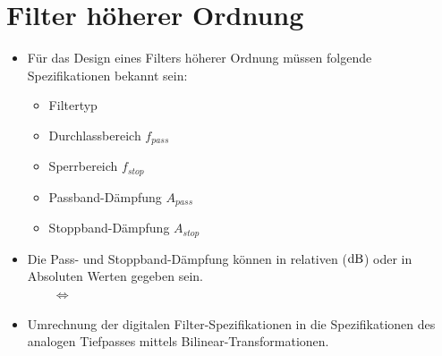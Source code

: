 	\section{Filter höherer Ordnung}
		\begin{itemize}
			\item Für das Design eines Filters höherer Ordnung müssen folgende Spezifikationen bekannt sein:\\[0.2cm]
			\begin{minipage}{0.35\textwidth}
			 \begin{itemize}
			  \item Filtertyp
			  \item Durchlassbereich $f_{pass}$
			  \item Sperrbereich $f_{stop}$
			 \end{itemize}
			\end{minipage}
			\begin{minipage}{0.5\textwidth}
			 \begin{itemize}
			  \item Passband-Dämpfung $A_{pass}$
			  \item Stoppband-Dämpfung $A_{stop}$
			 \end{itemize}
			\end{minipage}
			\item Die Pass- und Stoppband-Dämpfung können in relativen ($\text{dB}$) oder in Absoluten Werten gegeben sein.\\[0.2cm]
			$\qquad\Leftrightarrow\qquad$\\[-0.075cm]
			\item Umrechnung der digitalen Filter-Spezifikationen in die Spezifikationen des analogen Tiefpasses mittels Bilinear-Transformationen.
		\end{itemize}

